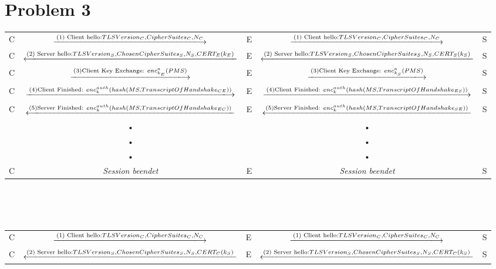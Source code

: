\documentclass[10pt,pdftex,a4paper]{article}
\begin{document}
\section*{Problem 3}
\begin{sidewaystable}
\begin{tabular}{|c|c|c|c|c|}
C &  $\xlongrightarrow{\text{(1) Client hello:} TLSVersion_{C},  CipherSuites_{C}, N_{C}}$  & E &  $\xlongrightarrow{\text{(1) Client hello:} TLSVersion_{C},  CipherSuites_{C}, N_{C}}$   & S \\ 

C &  $\xlongleftarrow{\text{(2) Server hello:} TLSVersion_{S},  ChosenCipherSuites_{S}, N_{S}, CERT_{E}(k_{E})}$ & E &  $\xlongleftarrow{\text{(2) Server hello:} TLSVersion_{S},  ChosenCipherSuites_{S}, N_{S}, CERT_{S}(k_{S})}$ & S \\ 

C &  $\xlongrightarrow{\text{(3)Client Key Exchange: } enc^{a}_{k_{E}}(PMS)}$  & E &  $\xlongrightarrow{\text{(3)Client Key Exchange: } enc^{a}_{k_{S}}(PMS)}$  & S \\ 

C &  $\xlongrightarrow{\text{(4)Client Finished: } enc_{k}^{auth}(hash(MS, TranscriptOfHandshake_{CE}))}$  & E &  $\xlongrightarrow{\text{(4)Client Finished: } enc_{k}^{auth}(hash(MS, TranscriptOfHandshake_{ES}))}$  & S \\ 

C &  $\xlongleftarrow{\text{(5)Server Finished: } enc_{k}^{auth}(hash(MS, TranscriptOfHandshake_{EC}))}$ & E &  $\xlongleftarrow{\text{(5)Server Finished: } enc_{k}^{auth}(hash(MS, TranscriptOfHandshake_{SE}))}$ & S \\ 
 & • &  & • &  \\ 
 & • &  & • &  \\ 
 & • &  & • &  \\ 
C & \textit{Session beendet} & E & \textit{Session beendet} & S \\ 
\end{tabular} 
\\\\
\\
\begin{tabular}{|c|c|c|c|c|}
C &  $\xlongrightarrow{\text{(1) Client hello:} TLSVersion_{C},  CipherSuites_{C}, N_{C}}$  & E &  $\xlongrightarrow{\text{(1) Client hello:} TLSVersion_{C},  CipherSuites_{C}, N_{C}}$   & S \\ 

C &  $\xlongleftarrow{\text{(2) Server hello:} TLSVersion_{S},  ChosenCipherSuites_{S}, N_{S}, CERT_{C}(k_{S})}$ & E &  $\xlongleftarrow{\text{(2) Server hello:} TLSVersion_{S},  ChosenCipherSuites_{S}, N_{S}, CERT_{C}(k_{S})}$ & S \\ 


\end{tabular}
\end{sidewaystable}
\end{document}
